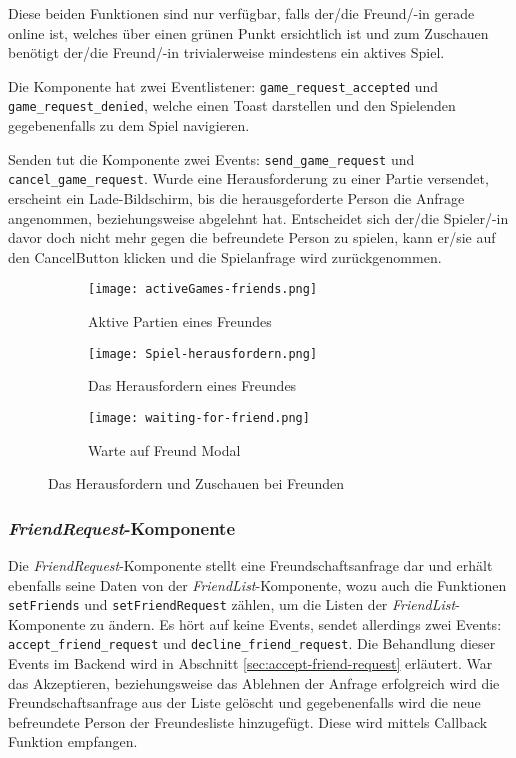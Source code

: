 Diese beiden Funktionen sind nur verfügbar, falls der/die Freund/-in gerade online ist, welches über einen grünen Punkt ersichtlich ist und zum Zuschauen benötigt der/die Freund/-in trivialerweise mindestens ein aktives Spiel.

Die Komponente hat zwei Eventlistener: \verb|game_request_accepted| und \linebreak \verb|game_request_denied|, welche einen Toast darstellen und den Spielenden gegebenenfalls zu dem Spiel navigieren. 

Senden tut die Komponente zwei Events: \verb|send_game_request| und \verb|cancel_game_request|. Wurde eine Herausforderung zu einer Partie versendet, erscheint ein Lade-Bildschirm, bis die herausgeforderte Person die Anfrage angenommen, beziehungsweise abgelehnt hat. Entscheidet sich der/die Spieler/-in davor doch nicht mehr gegen die befreundete Person zu spielen, kann er/sie auf den \glqq Cancel\grqq{ }Button klicken und die Spielanfrage wird zurückgenommen.

\begin{figure}[h]
\centering
  \begin{subfigure}[c]{0.35\textwidth}
  \centering
  \texttt{[image: activeGames-friends.png]}
  \caption{Aktive Partien eines Freundes}
  \label{fig:activeGames-friends}
  \end{subfigure}
  \hfill
  \begin{subfigure}[c]{0.3\textwidth}
  \centering
    \texttt{[image: Spiel-herausfordern.png]}
  \caption{Das Herausfordern eines Freundes}
  \label{fig:spiel-herausfordern}
  \end{subfigure}
  \hfill
 \begin{subfigure}[c]{0.3\textwidth}
  \centering
    \texttt{[image: waiting-for-friend.png]}
  \caption{Warte auf Freund Modal}
  \label{fig:waiting-for-friend}
  \end{subfigure}
  \caption{Das Herausfordern und Zuschauen bei Freunden}
  \label{fig:Freunde-zuschauen-herausfordern}
 
\end{figure}


\subsubsection{\textit{FriendRequest}-Komponente}
Die \textit{FriendRequest}-Komponente stellt eine Freundschaftsanfrage dar und erhält ebenfalls seine Daten von der \textit{FriendList}-Komponente, wozu auch die Funktionen \verb|setFriends| und \verb|setFriendRequest| zählen, um die Listen der \textit{FriendList}-Komponente zu ändern.
Es hört auf keine Events, sendet allerdings zwei Events: \verb|accept_friend_request| und \verb|decline_friend_request|. Die Behandlung dieser Events im Backend wird in Abschnitt \ref{sec:accept-friend-request} erläutert. War das Akzeptieren, beziehungsweise das Ablehnen der Anfrage erfolgreich wird die Freundschaftsanfrage aus der Liste gelöscht und gegebenenfalls wird die neue befreundete Person der Freundesliste hinzugefügt. Diese wird mittels Callback Funktion empfangen.


